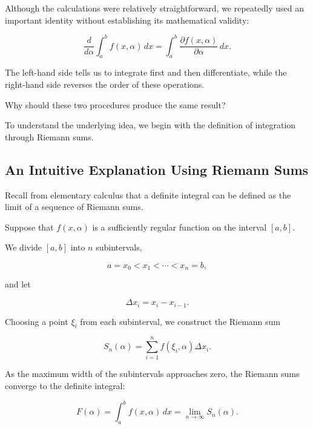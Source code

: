 \documentclass[11pt,a4paper]{article}
\theoremstyle{definition}
\theoremstyle{remark}
\begin{document}
Although the calculations were
relatively straightforward, we
repeatedly used an important identity
without establishing its mathematical
validity:

\begin{equation}
    \frac{d}{d\alpha}
    \int_a^b f(x,\alpha)\,dx
    =
    \int_a^b
    \frac{\partial f(x,\alpha)}
         {\partial\alpha}\,dx.
    \label{eq:leibniz_question}
\end{equation}

The left-hand side tells us to
integrate first and then
differentiate, while the
right-hand side reverses
the order of these operations.

Why should these two procedures
produce the same result?

To understand the underlying
idea, we begin with the
definition of integration
through Riemann sums.

\subsection{An Intuitive Explanation Using Riemann Sums}

Recall from elementary calculus
that a definite integral can be
defined as the limit of a
sequence of Riemann sums.

Suppose that $f(x,\alpha)$
is a sufficiently regular
function on the interval
$[a,b]$.

We divide $[a,b]$ into
$n$ subintervals,

\[
    a=x_0<x_1<\cdots<x_n=b,
\]

and let

\[
    \Delta x_i=x_i-x_{i-1}.
\]

Choosing a point $\xi_i$
from each subinterval,
we construct the Riemann sum

\begin{equation}
    S_n(\alpha)
    =
    \sum_{i=1}^{n}
    f(\xi_i,\alpha)\Delta x_i.
    \label{eq:riemann_parametric}
\end{equation}

As the maximum width of the
subintervals approaches zero,
the Riemann sums converge
to the definite integral:

\begin{equation}
    F(\alpha)
    =
    \int_a^b f(x,\alpha)\,dx
    =
    \lim_{n\to\infty}
    S_n(\alpha).
    \label{eq:riemann_limit}
\end{equation}
\end{document}
